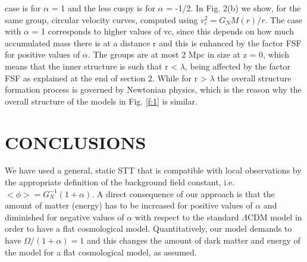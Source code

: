 \documentclass[10pt,journal]{IEEEtran}
\begin{document}
case is for $\alpha$ = 1 and the less cuspy is for $\alpha$ = -1/2.\newline
In Fig. 2(b) we show, for the same group, circular
velocity curves, computed using $v_{c}^{2}=G_NM(r)/r$. The
case with $\alpha$ = 1 corresponds to higher values of vc, since
this depends on how much accumulated mass there is at
a distance r and this is enhanced by the factor FSF for
positive values of $\alpha$. \newline
The groups are at most 2 Mpc in size at z = 0, which
means that the inner structure is such that r < $\lambda$, being
affected by the factor FSF as explained at the end of
section 2. While for r > $\lambda$ the overall structure formation
process is governed by Newtonian physics, which is the
reason why the overall structure of the models in Fig. \ref{f:1}
is similar.

\section{CONCLUSIONS}

We have used a general, static STT that is compatible
with local observations by the appropriate definition of
the background field constant, i.e. $<\phi>=G_N^{-1}(1+\alpha)$.
A direct consequence of our approach is that the amount
of matter (energy) has to be increased for positive values
of $\alpha$ and diminished for negative values of $\alpha$ with respect
to the standard $\Lambda$CDM model in order to have a flat cosmological model. Quantitatively, our model demands to
have $\Omega/(1+\alpha)=1$ and this changes the amount of dark
matter and energy of the model for a flat cosmological
model, as assumed. \newline
\end{document}
